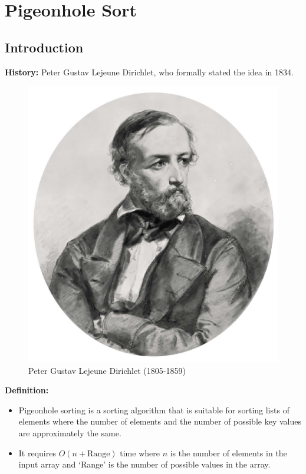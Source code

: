 \section{Pigeonhole Sort}

\subsection{Introduction}

\textbf{History:}
Peter Gustav Lejeune Dirichlet, who formally stated the idea in 1834.

\begin{figure}[H]
\centering
\includegraphics[scale=0.15]{img/pglDirichlet.jpg}
\caption{Peter Gustav Lejeune Dirichlet (1805-1859)}
\label{fig:pgl_dirichlet}
\end{figure}

\textbf{Definition:}
\begin{itemize}
    \item Pigeonhole sorting is a sorting algorithm that is suitable for sorting lists of elements where the number of elements and the number of possible key values are approximately the same.
    \item It requires $O(n + \text{Range})$ time where $n$ is the number of elements in the input array and ‘Range’ is the number of possible values in the array.
\end{itemize}


